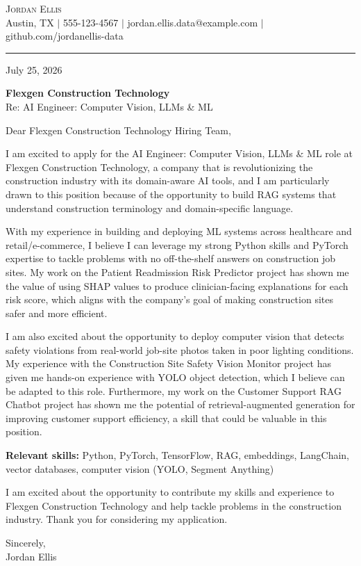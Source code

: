 \documentclass[letterpaper,11pt]{article}
\begin{document}
\begin{center}
    {\Large \scshape Jordan Ellis} \\ \vspace{2pt}
    \small Austin, TX $|$ 555-123-4567 $|$ jordan.ellis.data@example.com $|$ github.com/jordanellis-data
\end{center}
\vspace{6pt}
\hrule
\vspace{10pt}

July 25, 2026

\textbf{Flexgen Construction Technology} \\
Re: AI Engineer: Computer Vision, LLMs \& ML

\vspace{4pt}

Dear Flexgen Construction Technology Hiring Team,

I am excited to apply for the AI Engineer: Computer Vision, LLMs \& ML role at Flexgen Construction Technology, a company that is revolutionizing the construction industry with its domain-aware AI tools, and I am particularly drawn to this position because of the opportunity to build RAG systems that understand construction terminology and domain-specific language.

With my experience in building and deploying ML systems across healthcare and retail/e-commerce, I believe I can leverage my strong Python skills and PyTorch expertise to tackle problems with no off-the-shelf answers on construction job sites. My work on the Patient Readmission Risk Predictor project has shown me the value of using SHAP values to produce clinician-facing explanations for each risk score, which aligns with the company's goal of making construction sites safer and more efficient.

I am also excited about the opportunity to deploy computer vision that detects safety violations from real-world job-site photos taken in poor lighting conditions. My experience with the Construction Site Safety Vision Monitor project has given me hands-on experience with YOLO object detection, which I believe can be adapted to this role. Furthermore, my work on the Customer Support RAG Chatbot project has shown me the potential of retrieval-augmented generation for improving customer support efficiency, a skill that could be valuable in this position.

\textbf{Relevant skills:} Python, PyTorch, TensorFlow, RAG, embeddings, LangChain, vector databases, computer vision (YOLO, Segment Anything)

I am excited about the opportunity to contribute my skills and experience to Flexgen Construction Technology and help tackle problems in the construction industry. Thank you for considering my application.

\vspace{10pt}
Sincerely, \\
Jordan Ellis
\end{document}
